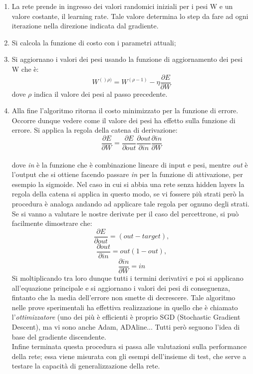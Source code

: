 \begin{enumerate}
\item La rete prende in ingresso dei valori randomici iniziali per i pesi W e un valore costante,
 il learning rate. Tale valore determina lo step da fare ad 
 ogni iterazione nella direzione indicata dal gradiente. 
\item Si calcola la funzione di costo con i parametri attuali;
\item Si aggiornano i valori dei pesi usando la funzione di aggiornamento dei pesi W che è:
\[ W^{()\rho)} = W^{(\rho -1)} - \eta \frac{\partial E}{\partial W}\]
dove \(\rho\) indica il valore dei pesi al passo precedente.
\item Alla fine l'algoritmo ritorna il costo minimizzato per la funzione di errore. \\
Occorre dunque vedere come il valore dei pesi ha effetto sulla funzione di errore.
 Si applica la regola della catena di derivazione:\\
\[\frac{\partial E}{\partial W}  = \frac{\partial E}{\partial out}  \frac{\partial out}{\partial in}  \frac{\partial in}{\partial W} \] \\
dove \emph{in} è la funzione che è combinazione lineare di input e pesi, 
mentre \emph{out} è l’output che si ottiene facendo passare \emph{in} per la funzione di attivazione,
 per esempio la sigmoide.
Nel caso in cui si abbia una rete senza hidden layers la regola della catena si applica in questo modo, 
se vi fossere più strati però la procedura è analoga andando ad applicare tale regola
 per ognuno degli strati. 
Se si vanno a valutare le nostre derivate per il caso del percettrone, si può facilmente dimostrare che:\\
\[\frac{\partial E}{\partial out} = (out - target),\]
\[\frac{\partial out}{\partial in} = out(1-out),\]
\[\frac{\partial in}{\partial W} = in \]
Si moltiplicando tra loro dunque tutti i termini derivativi e poi si applicano all’equazione principale 
e si aggiornano i valori dei pesi di conseguenza, fintanto che la media dell’errore non smette
 di decrescere. 
Tale algoritmo nelle prove sperimentali ha effettiva realizzazione in quello che è chiamato l’\emph{ottimizzatore}
 (uno dei più è efficienti è proprio SGD (Stochastic Gradient Descent), ma vi sono anche Adam, ADAline... 
 Tutti però seguono l’idea di base del gradiente discendente.\\ 
 Infine terminata questa procedura si passa alle valutazioni sulla performance della rete;
  essa viene misurata con gli esempi dell’insieme di test, che serve a testare la capacità di 
  generalizzazione della rete.
\end{enumerate}
